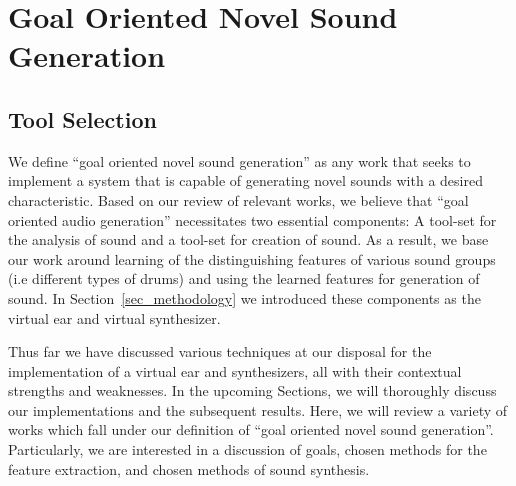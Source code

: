 \documentclass[\main/thesis.tex]{subfiles}
\begin{document}

% 
\section{Goal Oriented Novel Sound Generation}

\label{related}
\subsection{Tool Selection}
We define \enquote{goal oriented novel sound generation} as any work that seeks to implement a system that is capable of generating novel sounds with a desired characteristic. Based on our review of relevant works, we believe that \enquote{goal oriented audio generation} necessitates two essential components: A tool-set for the analysis of sound and a tool-set for creation of sound. As a result, we base our work around learning of the distinguishing features of various sound groups (i.e different types of drums) and using the learned features for generation of sound. In Section~\ref{sec_methodology} we introduced these components as the virtual ear and virtual synthesizer. 

 Thus far we have discussed various techniques at our disposal for the implementation of a virtual ear and synthesizers, all with their contextual strengths and weaknesses. In the upcoming Sections, we will thoroughly discuss our implementations and the subsequent results. Here, we will review a variety of works which fall under our definition of \enquote{goal oriented novel sound generation}. Particularly, we are interested in a discussion of goals, chosen methods for the feature extraction, and chosen methods of sound synthesis. 
\end{document}
